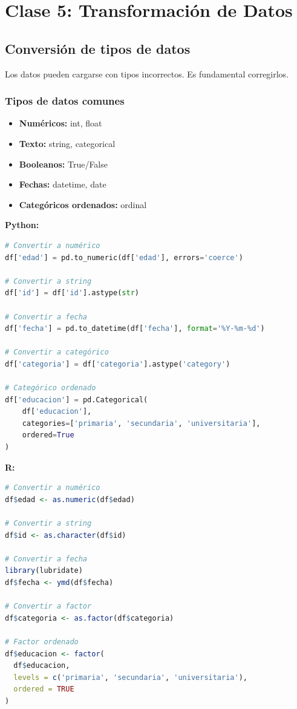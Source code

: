 \documentclass[a4paper,11pt]{article}
\begin{document}
\section{Clase 5: Transformación de Datos}

\subsection{Conversión de tipos de datos}

Los datos pueden cargarse con tipos incorrectos. Es fundamental corregirlos.

\subsubsection{Tipos de datos comunes}

\begin{itemize}
    \item \textbf{Numéricos:} int, float
    \item \textbf{Texto:} string, categorical
    \item \textbf{Booleanos:} True/False
    \item \textbf{Fechas:} datetime, date
    \item \textbf{Categóricos ordenados:} ordinal
\end{itemize}

\textbf{Python:}
\begin{lstlisting}[language=Python]
# Convertir a numérico
df['edad'] = pd.to_numeric(df['edad'], errors='coerce')

# Convertir a string
df['id'] = df['id'].astype(str)

# Convertir a fecha
df['fecha'] = pd.to_datetime(df['fecha'], format='%Y-%m-%d')

# Convertir a categórico
df['categoria'] = df['categoria'].astype('category')

# Categórico ordenado
df['educacion'] = pd.Categorical(
    df['educacion'],
    categories=['primaria', 'secundaria', 'universitaria'],
    ordered=True
)
\end{lstlisting}

\textbf{R:}
\begin{lstlisting}[language=R]
# Convertir a numérico
df$edad <- as.numeric(df$edad)

# Convertir a string
df$id <- as.character(df$id)

# Convertir a fecha
library(lubridate)
df$fecha <- ymd(df$fecha)

# Convertir a factor
df$categoria <- as.factor(df$categoria)

# Factor ordenado
df$educacion <- factor(
  df$educacion,
  levels = c('primaria', 'secundaria', 'universitaria'),
  ordered = TRUE
)
\end{lstlisting}
\end{document}
